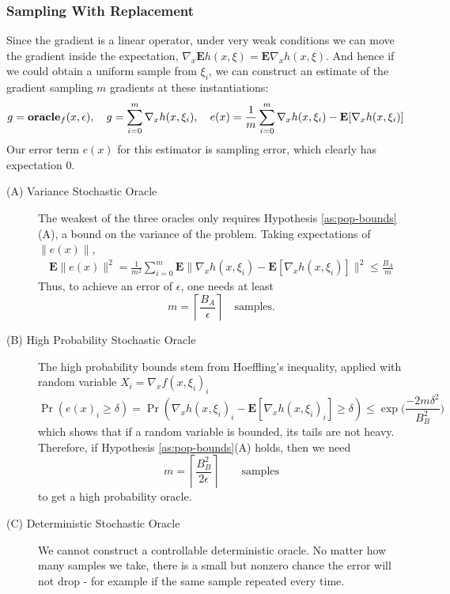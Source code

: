\subsubsection{Sampling With Replacement} Since the gradient is 
a linear operator, under very weak conditions we can move the gradient
inside the expectation, $\nabla_x \mathbf{E} h(x,\xi) = \mathbf{E} \nabla_x h(x, \xi)$.
And hence if we could obtain a uniform sample from $\xi_i$, we can construct an 
estimate of the gradient sampling $m$ gradients at these instantiations:
$$
g = \mbox{\bf oracle}_f(x,\epsilon),\quad g = \sum_{i=0}^m \nabla_x h(x,\xi_i), \quad e(x) = \frac{1}{m} \sum_{i=0}^m \nabla_x h(x,\xi_i) - \mathbf{E} [\nabla_x h(x,\xi_i)]
$$
Our error term $e(x)$ for this estimator is sampling error, which clearly has expectation 0. 
\begin{description}

\item[(A) Variance Stochastic Oracle] The weakest of the three oracles only
requires Hypothesis \ref{as:pop-bounds}(A), a bound on the variance of the problem. Taking expectations of
$\|e(x)\|$,
\begin{align*}
\mathbf{E}\|e(x)\|^{2}=\frac{1}{m^{2}}\sum_{i=0}^{m}\mathbf{E}\|\nabla_x h(x,\xi_{i})-\mathbf{E}[\nabla_x h(x,\xi_{i})]\|^{2}\leq\frac{B_{A}}{m}
\end{align*}
Thus, to achieve an error of $\epsilon$, one needs at least $$m = \left\lceil \frac{B_A}{\epsilon} \right\rceil \quad \mbox{samples.}$$

\item[(B) High Probability Stochastic Oracle] The high probability bounds
stem from Hoeffling's inequality, applied with random variable $X_i = \nabla_x f(x,\xi_{i})_i$
$$
\Pr\left(e(x)_i \geq\delta\right)=\Pr\left(\nabla_x h(x,\xi_{i})_i-\mathbf{E}[\nabla_x h(x,\xi_{i})_i] \geq\delta\right)\leq\exp\Big(\frac{-2m\delta^{2}}{B_B^{2}}\Big)
$$
which shows that if a random variable is
bounded, its tails are not heavy. Therefore, if Hypothesis \ref{as:pop-bounds}(A) holds, then we need
$$m = \left\lceil \frac{B_B^{2}}{2\epsilon}\right\rceil \qquad \mbox{samples} $$ to get a high probability oracle. 

\item[(C) Deterministic Stochastic Oracle] We cannot construct a
controllable deterministic oracle. No matter how many samples we take, there is
a small but nonzero chance the error will not drop - for example if the same
sample repeated every time. 

\end{description}


